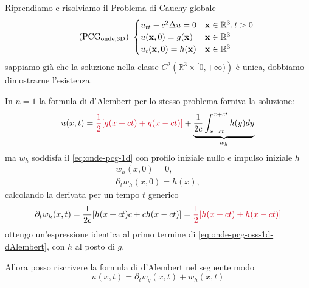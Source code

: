 \documentclass[10pt,a4paper,twoside,openright]{book}
\newcommand{\x}{\mathbf{x}}
\begin{document}
Riprendiamo e risolviamo il Problema di Cauchy globale
\begin{equation*}
	\tag{PCG$_{\text{onde,3D}}$} \ 
	\begin{cases}
		u_{tt} -c^{2} \Delta u=0            & \x \in \mathbb{R}^{3} ,t >0 \\
		u(\x ,0) =g(\x)     & \x\in\mathbb{R}^{3}        \\
		u_{t}(\x ,0) =h(\x) & \x\in\mathbb{R}^{3}        
	\end{cases}
\end{equation*}
sappiamo già che la soluzione nella classe $C^{2}\left(\mathbb{R}^{3} \times [ 0,+\infty )\right)$ è unica, dobbiamo dimostrarne l'esistenza.
\begin{oss}
	In $\displaystyle n=1$ la formula di d'Alembert per lo stesso problema forniva la soluzione:
	\begin{equation}
		u( x,t) =\textcolor[rgb]{0.82,0.01,0.11}{\frac{1}{2}[g(x+ct)+g(x-ct)]} +\underbrace{\frac{1}{2c}\int _{x-ct}^{x+ct} h( y) dy}_{w_{h}}
		\label{eq:onde-pcg-oss-1d-dAlembert}
	\end{equation}
	ma $\displaystyle w_{h}$ soddisfa il \eqref{eq:onde-pcg-1d} con profilo iniziale nullo e impulso iniziale $\displaystyle h$
	\begin{gather*}
		w_{h}( x,0) =0,\\
		\partial _{t} w_{h}( x,0) =h( x) ,
	\end{gather*}
	calcolando la derivata per un tempo $t$ generico
	\begin{equation*}
		\partial _{t} w_{h}( x,t) =\frac{1}{2c}[ h( x+ct) c+ch( x-ct)] =\textcolor[rgb]{0.82,0.01,0.11}{\frac{1}{2}[h(x+ct)+h(x-ct)]}
	\end{equation*}
	ottengo un'espressione identica al primo termine di \eqref{eq:onde-pcg-oss-1d-dAlembert}, con $\displaystyle h$ al posto di $\displaystyle g$.
	
	Allora posso riscrivere la formula di d'Alembert nel seguente modo
	\begin{equation*}
		u( x,t) =\partial _{t} w_{g}( x,t) +w_{h}( x,t)
	\end{equation*}
\end{oss}
\end{document}
